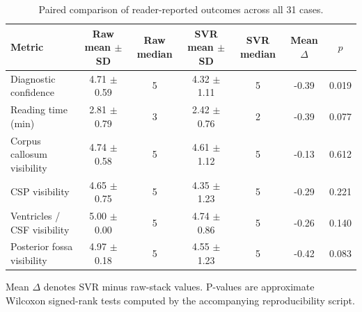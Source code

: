 \begin{table}[htbp]
\centering
\caption{Paired comparison of reader-reported outcomes across all 31 cases.}
\label{tab:paired_metrics_all}
\begin{threeparttable}
\begin{tabular}{lcccccc}
\toprule
Metric & Raw mean $\pm$ SD & Raw median & SVR mean $\pm$ SD & SVR median & Mean $\Delta$ & $p$ \\
\midrule
Diagnostic confidence & 4.71 $\pm$ 0.59 & 5 & 4.32 $\pm$ 1.11 & 5 & -0.39 & 0.019 \\
Reading time (min) & 2.81 $\pm$ 0.79 & 3 & 2.42 $\pm$ 0.76 & 2 & -0.39 & 0.077 \\
Corpus callosum visibility & 4.74 $\pm$ 0.58 & 5 & 4.61 $\pm$ 1.12 & 5 & -0.13 & 0.612 \\
CSP visibility & 4.65 $\pm$ 0.75 & 5 & 4.35 $\pm$ 1.23 & 5 & -0.29 & 0.221 \\
Ventricles / CSF visibility & 5.00 $\pm$ 0.00 & 5 & 4.74 $\pm$ 0.86 & 5 & -0.26 & 0.140 \\
Posterior fossa visibility & 4.97 $\pm$ 0.18 & 5 & 4.55 $\pm$ 1.23 & 5 & -0.42 & 0.083 \\
\bottomrule
\end{tabular}
\begin{tablenotes}[flushleft]
\footnotesize
\item Mean $\Delta$ denotes SVR minus raw-stack values. P-values are approximate Wilcoxon signed-rank tests computed by the accompanying reproducibility script.
\end{tablenotes}
\end{threeparttable}
\end{table}

